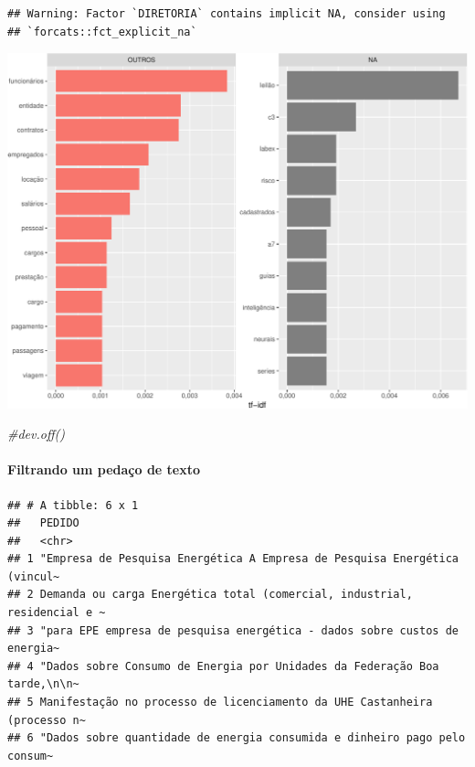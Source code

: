 \documentclass[]{article}
\newenvironment{Shaded}{\begin{snugshade}}{\end{snugshade}}
\newcommand{\CommentTok}[1]{\textcolor[rgb]{0.56,0.35,0.01}{\textit{#1}}}
\newcommand{\KeywordTok}[1]{\textcolor[rgb]{0.13,0.29,0.53}{\textbf{#1}}}
\newcommand{\NormalTok}[1]{#1}
\newcommand{\OperatorTok}[1]{\textcolor[rgb]{0.81,0.36,0.00}{\textbf{#1}}}
\newcommand{\StringTok}[1]{\textcolor[rgb]{0.31,0.60,0.02}{#1}}
\let\oldparagraph\paragraph
\renewcommand{\paragraph}[1]{\oldparagraph{#1}\mbox{}}
\begin{document}
\begin{verbatim}
## Warning: Factor `DIRETORIA` contains implicit NA, consider using
## `forcats::fct_explicit_na`
\end{verbatim}

\includegraphics{markdown_v50_files/figure-latex/02_freq_palavras_dir-1.pdf}

\begin{Shaded}
\begin{Highlighting}[]
\CommentTok{#dev.off()}
\end{Highlighting}
\end{Shaded}

\hypertarget{filtrando-um-pedaco-de-texto}{%
\paragraph{Filtrando um pedaço de
texto}\label{filtrando-um-pedaco-de-texto}}

\begin{Shaded}
\end{Shaded}

\begin{verbatim}
## # A tibble: 6 x 1
##   PEDIDO                                                                   
##   <chr>                                                                    
## 1 "Empresa de Pesquisa Energética A Empresa de Pesquisa Energética (vincul~
## 2 Demanda ou carga Energética total (comercial, industrial, residencial e ~
## 3 "para EPE empresa de pesquisa energética - dados sobre custos de energia~
## 4 "Dados sobre Consumo de Energia por Unidades da Federação Boa tarde,\n\n~
## 5 Manifestação no processo de licenciamento da UHE Castanheira (processo n~
## 6 "Dados sobre quantidade de energia consumida e dinheiro pago pelo consum~
\end{verbatim}
\end{document}
